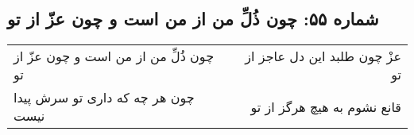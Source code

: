 \begin{center}
\section*{شماره ۵۵: چون ذُلِّ من از من است و چون عزّ از تو}
\label{sec:055}
\begin{longtable}{l p{0.5cm} r}
چون ذُلِّ من از من است و چون عزّ از تو
&&
عزْ چون طلبد این دل عاجز از تو
\\
چون هر چه که داری تو سرش پیدا نیست
&&
قانع نشوم به هیچ هرگز از تو
\\
\end{longtable}
\end{center}
